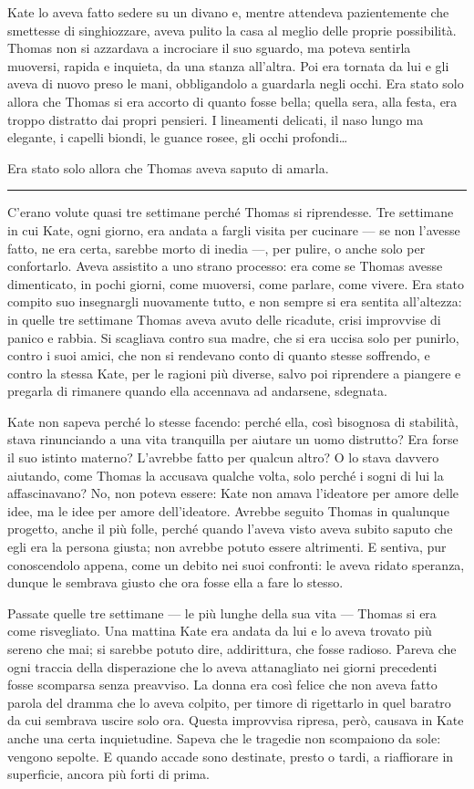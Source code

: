 \documentclass[a4paper,oneside,11pt]{memoir}
\begin{document}
Kate lo aveva fatto sedere su un divano e, mentre attendeva pazientemente che
smettesse di singhiozzare, aveva pulito la casa al meglio delle proprie
possibilità. Thomas non si azzardava a incrociare il suo sguardo, ma poteva
sentirla muoversi, rapida e inquieta, da una stanza all'altra. Poi era tornata
da lui e gli aveva di nuovo preso le mani, obbligandolo a guardarla negli occhi.
Era stato solo allora che Thomas si era accorto di quanto fosse bella; quella
sera, alla festa, era troppo distratto dai propri pensieri. I lineamenti
delicati, il naso lungo ma elegante, i capelli biondi, le guance rosee, gli
occhi profondi\dots{}

Era stato solo allora che Thomas aveva saputo di amarla.

\plainbreak{1}

C'erano volute quasi tre settimane perché Thomas si riprendesse. Tre settimane
in cui Kate, ogni giorno, era andata a fargli visita per cucinare --- se non
l'avesse fatto, ne era certa, sarebbe morto di inedia ---, per pulire, o anche
solo per confortarlo. Aveva assistito a uno strano processo: era come se Thomas
avesse dimenticato, in pochi giorni, come muoversi, come parlare, come vivere.
Era stato compito suo insegnargli nuovamente tutto, e non sempre si era sentita
all'altezza: in quelle tre settimane Thomas aveva avuto delle ricadute, crisi
improvvise di panico e rabbia. Si scagliava contro sua madre, che si era uccisa
solo per punirlo, contro i suoi amici, che non si rendevano conto di quanto
stesse soffrendo, e contro la stessa Kate, per le ragioni più diverse, salvo poi
riprendere a piangere e pregarla di rimanere quando ella accennava ad andarsene,
sdegnata.

Kate non sapeva perché lo stesse facendo: perché ella, così bisognosa di
stabilità, stava rinunciando a una vita tranquilla per aiutare un uomo
distrutto? Era forse il suo istinto materno? L'avrebbe fatto per qualcun altro?
O lo stava davvero aiutando, come Thomas la accusava qualche volta, solo perché
i sogni di lui la affascinavano? No, non poteva essere: Kate non amava
l'ideatore per amore delle idee, ma le idee per amore dell'ideatore. Avrebbe
seguito Thomas in qualunque progetto, anche il più folle, perché quando l'aveva
visto aveva subito saputo che egli era la persona giusta; non avrebbe potuto
essere altrimenti. E sentiva, pur conoscendolo appena, come un debito nei suoi
confronti: le aveva ridato speranza, dunque le sembrava giusto che ora fosse
ella a fare lo stesso.

Passate quelle tre settimane --- le più lunghe della sua vita --- Thomas si era
come risvegliato. Una mattina Kate era andata da lui e lo aveva trovato più
sereno che mai; si sarebbe potuto dire, addirittura, che fosse radioso. Pareva
che ogni traccia della disperazione che lo aveva attanagliato nei giorni
precedenti fosse scomparsa senza preavviso. La donna era così felice che non
aveva fatto parola del dramma che lo aveva colpito, per timore di rigettarlo in
quel baratro da cui sembrava uscire solo ora. Questa improvvisa ripresa, però,
causava in Kate anche una certa inquietudine. Sapeva che le tragedie non
scompaiono da sole: vengono sepolte. E quando accade sono destinate, presto o
tardi, a riaffiorare in superficie, ancora più forti di prima.
\end{document}
